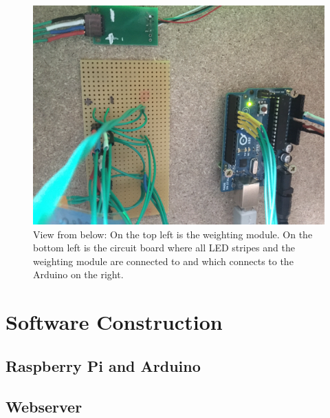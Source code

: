 \documentclass{acm_proc_article-sp}
\begin{document}
\begin{figure}[htbp] 
  \centering
     \includegraphics[width=1\linewidth]{pictures/built_in_electronic.JPG}
  \caption{View from below: On the top left is the weighting module. On the bottom left is the circuit board where all LED stripes and the weighting module are connected to and which connects to the Arduino on the right.}
  \label{fig:viewfrombelow}
\end{figure}


\section{Software Construction}
\subsection{Raspberry Pi and Arduino}
\subsection{Webserver}\label{sec:webserver}
\end{document}
